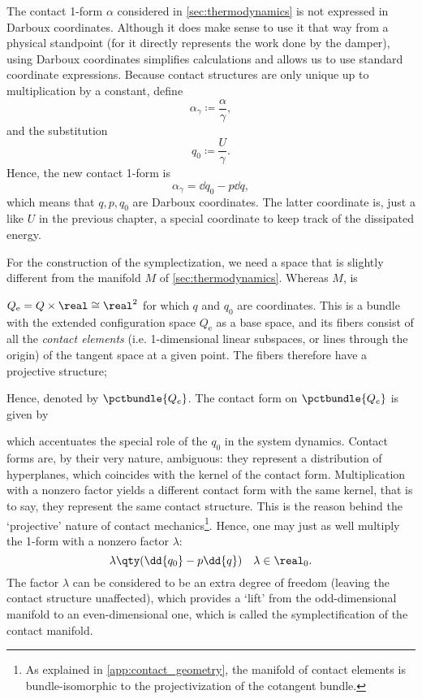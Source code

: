 The contact 1-form $\alpha$ considered in \cref{sec:thermodynamics} is not expressed in Darboux coordinates. Although it does make sense to use it that way from a physical standpoint (for it directly represents the work done by the damper), using Darboux coordinates simplifies calculations and allows us to use standard coordinate expressions. Because contact structures are only unique up to multiplication by a constant, define
$$ \alpha_\gamma \coloneq \frac{\alpha}{\gamma}, $$
and the substitution
$$ q_0 \coloneq \frac{U}{\gamma}.$$
Hence, the new contact 1-form is
\begin{equation}
    \alpha_\gamma = \dd{q_0} - p\dd{q}, 
    \label{eq:dho_contact_form}
\end{equation}
which means that $q, p, q_0$ are Darboux coordinates. The latter coordinate is, just a like $U$ in the previous chapter, a special coordinate to keep track of the dissipated energy. 

For the construction of the symplectization, we need a space that is slightly different from the manifold $M$ of \cref{sec:thermodynamics}. Whereas $M$, is 

$Q_\text{e} = Q \times \real \cong \real^2$ for which $q$ and $q_0$ are coordinates. This is a bundle with the extended configuration space $Q_\text{e}$ as a base space, and its fibers consist of all the \emph{contact elements} (i.e. 1-dimensional linear subspaces, or lines through the origin) of the tangent space at a given point. The fibers therefore have a projective structure; 

Hence, denoted by $\pctbundle{Q_e}$. The contact form on $\pctbundle{Q_e}$ is given by 

which accentuates the special role of the $q_0$ in the system dynamics. Contact forms are, by their very nature, ambiguous: they represent a distribution of hyperplanes, which coincides with the kernel of the contact form. Multiplication with a nonzero factor yields a different contact form with the same kernel, that is to say, they represent the same contact structure. This is the reason behind the `projective' nature of contact mechanics\footnote{As explained in \cref{app:contact_geometry}, the manifold of contact elements is bundle-isomorphic to the projectivization of the cotangent bundle.}. Hence, one may just as well multiply the 1-form with a nonzero factor $\lambda$:
$$ \lambda\qty(\dd{q_0} - p\dd{q}) \quad \lambda \in \real_0. $$
The factor $\lambda$ can be considered to be an extra degree of freedom (leaving the contact structure unaffected), which provides a `lift' from the odd-dimensional manifold to an even-dimensional one, which is called the symplectification of the contact manifold. \cite{Arnold1989}

